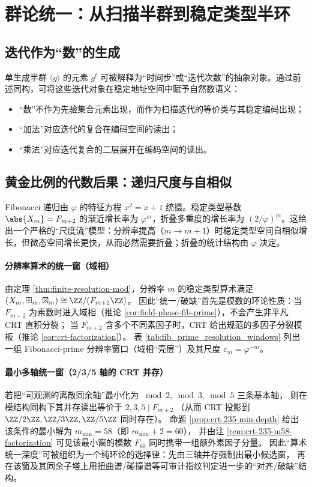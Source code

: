 \section{群论统一：从扫描半群到稳定类型半环}\label{sec:group-unification}

\subsection{迭代作为“数”的生成}

单生成半群 $\langle g\rangle$ 的元素 $g^t$ 可被解释为“时间步”或“迭代次数”的抽象对象。通过前述同构，可将这些迭代对象在稳定地址空间中赋予自然数语义：
\begin{itemize}
  \item “数”不作为先验集合元素出现，而作为扫描迭代的等价类与其稳定编码出现；
  \item “加法”对应迭代的复合在编码空间的读出；
  \item “乘法”对应迭代复合的二层展开在编码空间的读出。
\end{itemize}

\subsection{黄金比例的代数后果：递归尺度与自相似}

Fibonacci 递归由 $\varphi$ 的特征方程 $x^2=x+1$ 统摄。稳定类型基数 $\abs{X_m}=F_{m+2}$ 的渐近增长率为 $\varphi^m$，折叠多重度的增长率为 $(2/\varphi)^m$。这给出一个严格的“尺度流”模型：分辨率提高（$m\to m+1$）时稳定类型空间自相似增长，但微态空间增长更快，从而必然需要折叠；折叠的统计结构由 $\varphi$ 决定。

\paragraph{分辨率算术的统一窗（域相）}
由定理 \ref{thm:finite-resolution-mod}，分辨率 $m$ 的稳定类型算术满足
\((X_m,\boxplus_m,\boxtimes_m)\cong \ZZ/(F_{m+2}\ZZ)\)。
因此“统一/破缺”首先是模数的环论性质：当 $F_{m+2}$ 为素数时进入域相（推论 \ref{cor:field-phase-fib-prime}），不会产生非平凡 CRT 直积分裂；
当 $F_{m+2}$ 含多个不同素因子时，CRT 给出规范的多因子分裂模板（推论 \ref{cor:crt-factorization}）。
表 \ref{tab:fib_prime_resolution_windows} 列出一组 Fibonacci-prime 分辨率窗口（域相“壳层”）及其尺度 $\varepsilon_m=\varphi^{-m}$。


\paragraph{最小多轴统一窗（2/3/5 轴的 CRT 并存）}
若把“可观测的离散同余轴”最小化为 \(\bmod 2,\bmod 3,\bmod 5\) 三条基本轴，
则在模结构同构下其并存读出等价于
\(
2,3,5\mid F_{m+2}
\)
（从而 CRT 投影到 \(\ZZ/2\ZZ,\ZZ/3\ZZ,\ZZ/5\ZZ\) 同时存在）。
命题 \ref{prop:crt-235-min-depth} 给出该条件的最小解为 \(m_{\min}=58\)（即 \(m_{\min}+2=60\)），
并由注 \ref{rem:crt-235-m58-factorization} 可见该最小窗的模数 \(F_{60}\) 同时携带一组额外素因子分量。
因此“算术统一深度”可被组织为一个纯环论的选择律：先由三轴并存强制出最小候选窗，
再在该窗及其同余子塔上用扭曲谱/碰撞谱等可审计指纹判定进一步的“对齐/破缺”结构。

